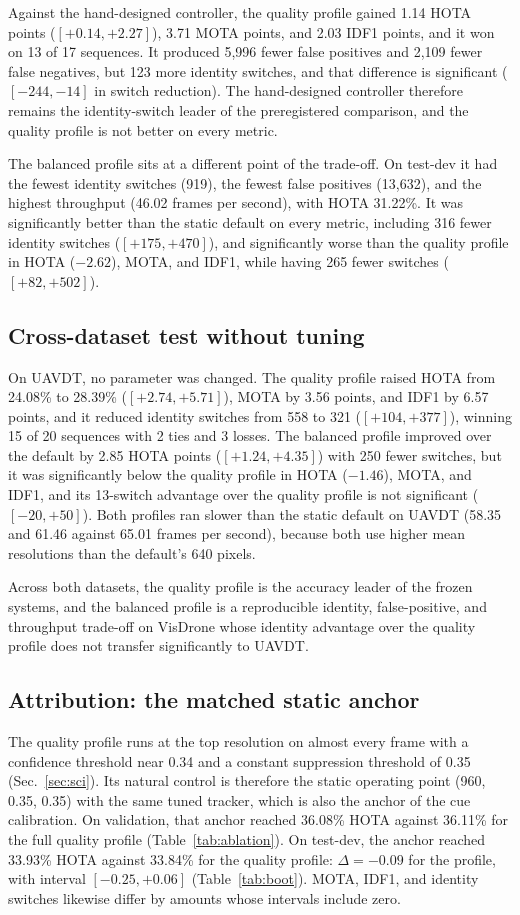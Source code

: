 \documentclass[journal]{new-aiaa}
\begin{document}
Against the hand-designed controller, the quality profile gained 1.14 HOTA points ($[+0.14, +2.27]$), 3.71 MOTA points, and 2.03 IDF1 points, and it won on 13 of 17 sequences. It produced 5,996 fewer false positives and 2,109 fewer false negatives, but 123 more identity switches, and that difference is significant ($[-244, -14]$ in switch reduction). The hand-designed controller therefore remains the identity-switch leader of the preregistered comparison, and the quality profile is not better on every metric.

The balanced profile sits at a different point of the trade-off. On test-dev it had the fewest identity switches (919), the fewest false positives (13,632), and the highest throughput (46.02 frames per second), with HOTA 31.22\%. It was significantly better than the static default on every metric, including 316 fewer identity switches ($[+175, +470]$), and significantly worse than the quality profile in HOTA ($-2.62$), MOTA, and IDF1, while having 265 fewer switches ($[+82, +502]$).

\subsection{Cross-dataset test without tuning}
On UAVDT, no parameter was changed. The quality profile raised HOTA from 24.08\% to 28.39\% ($[+2.74, +5.71]$), MOTA by 3.56 points, and IDF1 by 6.57 points, and it reduced identity switches from 558 to 321 ($[+104, +377]$), winning 15 of 20 sequences with 2 ties and 3 losses. The balanced profile improved over the default by 2.85 HOTA points ($[+1.24, +4.35]$) with 250 fewer switches, but it was significantly below the quality profile in HOTA ($-1.46$), MOTA, and IDF1, and its 13-switch advantage over the quality profile is not significant ($[-20, +50]$). Both profiles ran slower than the static default on UAVDT (58.35 and 61.46 against 65.01 frames per second), because both use higher mean resolutions than the default's 640 pixels.

Across both datasets, the quality profile is the accuracy leader of the frozen systems, and the balanced profile is a reproducible identity, false-positive, and throughput trade-off on VisDrone whose identity advantage over the quality profile does not transfer significantly to UAVDT.

\subsection{Attribution: the matched static anchor}
The quality profile runs at the top resolution on almost every frame with a confidence threshold near 0.34 and a constant suppression threshold of 0.35 (Sec.~\ref{sec:sci}). Its natural control is therefore the static operating point (960, 0.35, 0.35) with the same tuned tracker, which is also the anchor of the cue calibration. On validation, that anchor reached 36.08\% HOTA against 36.11\% for the full quality profile (Table~\ref{tab:ablation}). On test-dev, the anchor reached 33.93\% HOTA against 33.84\% for the quality profile: $\Delta=-0.09$ for the profile, with interval $[-0.25, +0.06]$ (Table~\ref{tab:boot}). MOTA, IDF1, and identity switches likewise differ by amounts whose intervals include zero.
\end{document}
